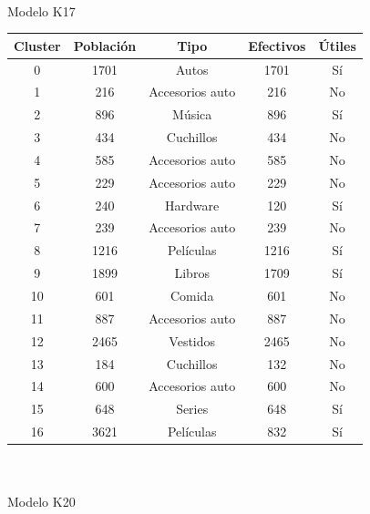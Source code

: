 \\
Modelo K17\\
\begin{tabular}{| c | c | c | c | c |}\hline
Cluster & Población & Tipo & Efectivos & Útiles\\\hline
0 & 1701 & Autos & 1701 & Sí\\
1 & 216 & Accesorios auto & 216 & No\\
2 & 896 & Música & 896 & Sí\\
3 & 434 & Cuchillos & 434 & No\\
4 & 585 & Accesorios auto & 585 & No\\
5 & 229 & Accesorios auto & 229 & No\\
6 & 240 & Hardware & 120 & Sí\\
7 & 239 & Accesorios auto & 239 & No\\
8 & 1216 & Películas & 1216 & Sí\\
9 & 1899 & Libros & 1709 & Sí\\
10 & 601 & Comida & 601 & No\\
11 & 887 & Accesorios auto & 887 & No\\
12 & 2465 & Vestidos & 2465 & No\\
13 & 184 & Cuchillos & 132 & No\\
14 & 600 & Accesorios auto & 600 & No\\
15 & 648 & Series & 648 & Sí\\
16 & 3621 & Películas & 832 & Sí\\\hline
\end{tabular}\\
\\
Modelo K20\\
